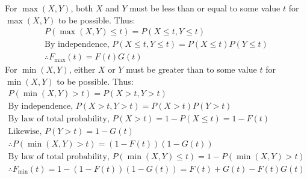 \documentclass[11pt,a4paper,margin=1in]{article}
\begin{document}
\section{}
    For $\max(X, Y)$, both $X$ and $Y$ must be less than or equal to some value 
    $t$ for $\max(X, Y)$ to be possible. Thus:
    \begin{gather*}
        P(\max(X, Y) \leq t) = P(X \leq t, Y \leq t)\\
        \text{By independence, } P(X \leq t, Y \leq t) = P(X \leq t) P(Y \leq t)\\
        \therefore F_{\max}(t) = F(t) G(t)
    \end{gather*}
    For $\min(X, Y)$, either $X$ or $Y$ must be greater than to some value $t$
    for $\min(X, Y)$ to be possible. Thus:
    \begin{gather*}
        P(\min(X, Y) > t) = P(X > t, Y > t)\\
        \text{By independence, } P(X > t, Y > t) = P(X > t) P(Y > t)\\
        \text{By law of total probability, } P(X > t) = 1 - P(X \leq t) = 1 - F(t)\\
        \text{Likewise, } P(Y > t) = 1 - G(t)\\
        \therefore P(\min(X, Y) > t) = (1 - F(t))(1 - G(t))\\
        \text{By law of total probability, } P(\min(X, Y) \leq t) = 1 - P(\min(X, Y) > t)\\
        \therefore F_{\min}(t) = 1 - (1 - F(t))(1 - G(t)) = F(t) + G(t) - F(t)G(t)
    \end{gather*}
\end{document}
